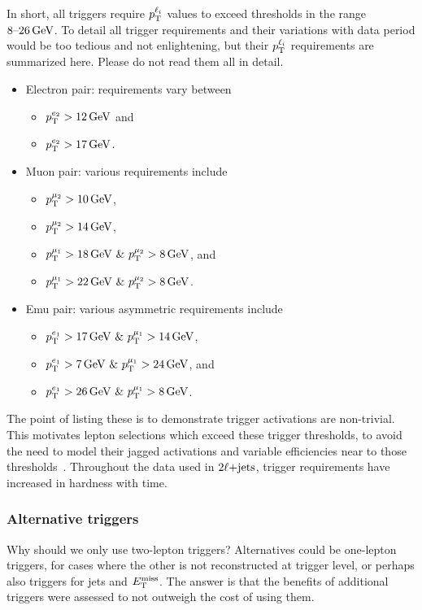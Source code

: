 In short, all triggers require $\pt^{\ell_i}$ values to exceed thresholds in
the range $8\textrm{--}26\,\eV[G]$.
To detail all trigger requirements and their variations with data period
would be too tedious and not enlightening, but their $\pt^{\ell_i}$ requirements
are summarized here.
Please do not read them all in detail.
\begin{itemize}
\item Electron pair: requirements vary between
\begin{itemize}
\item $\pt^{e_2} > 12\,\eV[G]$ and
\item $\pt^{e_2} > 17\,\eV[G]$.
\end{itemize}
\item Muon pair: various requirements include
\begin{itemize}
\item $\pt^{\mu_2} > 10\,\eV[G]$,
\item $\pt^{\mu_2} > 14\,\eV[G]$,
\item $\pt^{\mu_1} > 18\,\eV[G]~\&~\pt^{\mu_2} > 8\,\eV[G]$, and
\item $\pt^{\mu_1} > 22\,\eV[G]~\&~\pt^{\mu_2} > 8\,\eV[G]$.
\end{itemize}
\item Emu pair: various asymmetric requirements include
\begin{itemize}
\item $\pt^{e_1} > 17\,\eV[G]~\&~\pt^{\mu_1} > 14\,\eV[G]$,
\item $\pt^{e_1} > 7\,\eV[G]~\&~\pt^{\mu_1} > 24\,\eV[G]$, and
\item $\pt^{e_1} > 26\,\eV[G]~\&~\pt^{\mu_1} > 8\,\eV[G]$.
\end{itemize}
\end{itemize}
The point of listing these is to demonstrate trigger activations are
non-trivial.
This motivates lepton selections which exceed these trigger thresholds,
to avoid the need to model their jagged activations and variable
efficiencies near to those thresholds~\cite{
atlas_trigger_egamma_run2,
atlas_trigger_muon_run2
}.
Throughout the data used in $\twoljets$, trigger requirements
have increased in hardness with time.


\subsubsection{Alternative triggers}
Why should we only use two-lepton triggers?
Alternatives could be one-lepton triggers, for cases where the other is not
reconstructed at trigger level, or perhaps also triggers for jets and $\met$.
The answer is that the benefits of additional triggers were assessed to not
outweigh the cost of using them.

